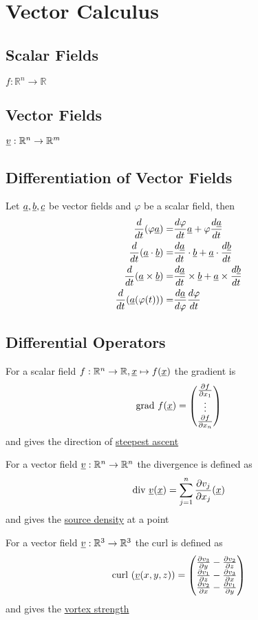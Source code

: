 \section{Vector Calculus}

\subsection*{Scalar Fields}
$f : \mathbb{R}^n \to \mathbb{R}$

\subsection*{Vector Fields}
$\underline{v} : \mathbb{R}^n \to \mathbb{R}^m$

\subsection*{Differentiation of Vector Fields}
Let $\underline{a}, \underline{b}, \underline{c}$ be vector fields and $\varphi$ be a scalar field, then
\begin{align*}
	\frac{d}{dt} (\varphi \underline{a})= & \frac{d\varphi}{dt}  \underline{a}+ \varphi \frac{d\underline{a}}{dt}\\
	\frac{d}{dt} (\underline{a} \cdot \underline{b})= &  \frac{d\underline{a}}{dt} \cdot \underline{b} +  \underline{a} \cdot \frac{d\underline{b}}{dt}\\
	\frac{d}{dt} (\underline{a} \times \underline{b})= &  \frac{d\underline{a}}{dt} \times \underline{b} +  \underline{a} \times \frac{d\underline{b}}{dt} \\
	\frac{d}{dt} ( \underline{a}(\varphi(t) ) )= & \frac{d\underline{a}}{d\varphi} \frac{d\varphi}{dt} \\
\end{align*}


\subsection*{Differential Operators}
For a scalar field $f : \mathbb{R}^n \to \mathbb{R}, \underline{x} \mapsto f(\underline{x})$ the gradient is
\[
	\text{grad } f(\underline{x})  = \begin{pmatrix} \frac{\partial f}{\partial x_1} \\ \vdots \\ \frac{\partial f}{\partial x_n} \end{pmatrix} 
\]
and gives the direction of \ul{steepest ascent}


For a vector field $\underline{v} : \mathbb{R}^n \to \mathbb{R}^n$ the divergence is defined as 
\[
	\text{div } \underline{v}(\underline{x}) = \sum_{j=1}^n \frac{\partial v_j}{\partial x_j}(\underline{x})
\]
and gives the \ul{source density} at a point

For a vector field $\underline{v} : \mathbb{R}^3 \to \mathbb{R}^3$ the curl is defined as 
\[
	\text{curl }(\underline{v}(x,y,z)) = \begin{pmatrix} \frac{\partial v_3}{\partial y} - \frac{\partial v_2}{\partial z} \\
						 \frac{\partial v_1}{\partial z} - \frac{\partial v_3}{\partial x}  \\
						 \frac{\partial v_2}{\partial x}  - \frac{\partial v_1}{\partial y} \end{pmatrix}
\]
and gives the \ul{vortex strength}



